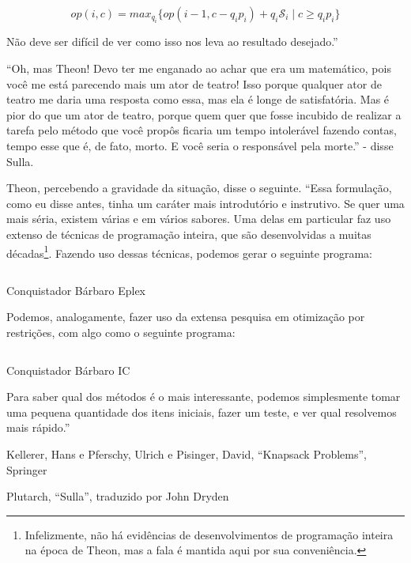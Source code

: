 \documentclass{article}
\begin{document}
\[
  op(i,c) =
    max_{q_i}\{op(i-1, c-q_i p_i) + q_i \mathscr{S}_i\; |\; c \geq q_i p_i\}
\]

Não deve ser difícil de ver como isso nos leva ao resultado desejado.''

``Oh, mas Theon! Devo ter me enganado ao achar que era um matemático, pois você me está parecendo
  mais um ator de teatro! Isso porque qualquer ator de teatro me daria uma resposta como essa, mas
  ela é longe de satisfatória. Mas é pior do que um ator de teatro, porque quem quer que fosse
  incubido de realizar a tarefa pelo método que você propôs ficaria um tempo intolerável fazendo
  contas, tempo esse que é, de fato, morto. E você seria o responsável pela morte.'' - disse Sulla.

  Theon, percebendo a gravidade da situação, disse o seguinte. ``Essa formulação, como eu disse
  antes, tinha um caráter mais introdutório e instrutivo. Se quer uma mais séria, existem várias e
  em vários sabores. Uma delas em particular faz uso extenso de técnicas de programação inteira, que
  são desenvolvidas a muitas décadas\footnote{Infelizmente, não há evidências de desenvolvimentos de
  programação inteira na época de Theon, mas a fala é mantida aqui por sua conveniência.}. Fazendo
  uso dessas técnicas, podemos gerar o seguinte programa:

  \begin{listing}
    \inputminted{prolog}{../Exemplos/Cap12/prog1-knapSackEplex.ecl}
    \caption{Conquistador Bárbaro Eplex}\label{lst:knapsackEplex}
  \end{listing}

  Podemos, analogamente, fazer uso da extensa pesquisa em otimização por restrições, com algo como o
  seguinte programa:

  \begin{listing}[H]
    \inputminted{prolog}{../Exemplos/Cap12/prog2-knapSackIc.ecl}
    \caption{Conquistador Bárbaro IC}\label{lst:knapsackEplex}
  \end{listing}

  Para saber qual dos métodos é o mais interessante, podemos simplesmente tomar uma pequena quantidade dos itens
  iniciais, fazer um teste, e ver qual resolvemos mais rápido.''








  \begin{thebibliography}{2}

    Kellerer, Hans e Pferschy, Ulrich e Pisinger, David,
    ``Knapsack Problems'', Springer

    Plutarch,
    ``Sulla'', traduzido por John Dryden


  \end{thebibliography}
\end{document}

